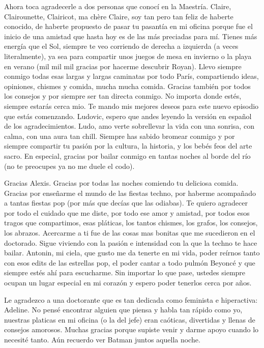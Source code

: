 Ahora toca agradecerle a dos personas que conocí en la Maestría. Claire, Clairounette, Clairicot, ma chère Claire, soy tan pero tan feliz de haberte conocido, de haberte propuesto de pasar tu pasantía en mi oficina porque fue el inicio de una amistad que hasta hoy es de las más preciadas para mí. Tienes más energía que el Sol, siempre te veo corriendo de derecha a izquierda (a veces literalmente), ya sea para compartir unos juegos de mesa en invierno o la playa en verano (mil mil mil gracias por hacerme descubrir Royan). Llevo siempre conmigo todas esas largas y largas caminatas por todo París, compartiendo ideas, opiniones, chismes y comida, mucha mucha comida. Gracias también por todos los consejos y por siempre ser tan directa conmigo. No importa donde estés, siempre estarás cerca mio. Te mando mis mejores deseos para este nuevo episodio que estás comenzando.
Ludovic, espero que andes leyendo la versión en español de los agradecimientos. Ludo, amo verte sobrellevar la vida con una sonrisa, con calma, con una aura tan chill. Siempre has sabido bromear conmigo y por siempre compartir tu pasión por la cultura, la historia, y los bebés feos del arte sacro. En especial, gracias por bailar conmigo en tantas noches al borde del río (no te preocupes ya no me duele el codo).

Gracias Alexis. Gracias por todas las noches comiendo tu deliciosa comida. Gracias por enseñarme el mundo de las fiestas techno, por haberme acompañado a tantas fiestas pop (por más que decías que las odiabas). Te quiero agradecer por todo el cuidado que me diste, por todo ese amor y amistad, por todos esos tragos que compartimos, esas pláticas, los tantos chismes, los grafos, los consejos, los abrazos. Acercarme a ti fue de las cosas mas bonitas que me sucedieron en el doctorado. Sigue viviendo con la pasión e intensidad con la que la techno te hace bailar.
Antonin, mi ciela, que gusto me da tenerte en mi vida, poder reírnos tanto con esos edits de las estrellas pop, el poder cantar a todo pulmón Beyoncé y que siempre estés ahí para escucharme.
Sin importar lo que pase, ustedes siempre ocupan un lugar especial en mi corazón y espero poder tenerlos cerca por años.

Le agradezco a una doctorante que es tan dedicada como feminista e hiperactiva: Adeline. No pensé encontrar alguien que piensa y habla tan rápido como yo, nuestras platicas en mi oficina (o la del jefe) eran caóticas, divertidas y llenas de consejos amorosos. Muchas gracias porque supiste venir y darme apoyo cuando lo necesité tanto. Aún recuerdo ver Batman juntos aquella noche.

